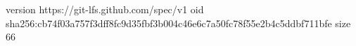 version https://git-lfs.github.com/spec/v1
oid sha256:cb74f03a757f3dff8fc9d35fbf3b004c46e6c7a50fc78f55e2b4c5ddbf711bfe
size 66
